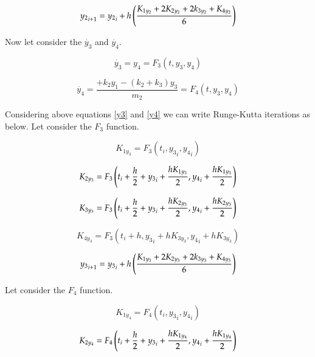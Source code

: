 \begin{equation}
    {y_2}_{i+1} = {y_2}_i +h \left( K_{1y_2}+ 2K_{2y_2} + 2k_{3y_2} +K_{4y_2}  \over 6 \right)
\end{equation}



Now let consider the $\dot{y_3}$ and $\dot{y_4}$. 

\begin{equation}
\label{y3}
    \dot{y_3} = y_4 = F_3(t,y_3,y_4)
\end{equation} 

\begin{equation}
\label{y4}
    \dot{y_4} = \frac{+k_2y_1-(k_2+k_3)y_3 }{m_2} = F_4(t,y_3,y_4)
\end{equation}

Considering above equations \eqref{y3} and \eqref{y4} we can write Runge-Kutta iterations as below. Let consider the $F_3$ function.

\begin{equation}
    {K_{1y_3}} = F_3(t_i,{y_3}_i,{y_4}_i)
\end{equation}

\begin{equation}
    {K_{2y_3}} = F_3\left( {{t_i}+\frac{h}{2} + {y_3}_i+{h K_{1y_3} \over 2},{y_4}_i + {h K_{1y_3} \over 2}} \right)
\end{equation}

\begin{equation}
    {K_{3y_3}} = F_3\left( {{t_i}+\frac{h}{2} + {y_3}_i+{h K_{2y_3} \over 2},{y_4}_i + {h K_{2y_3} \over 2}} \right)
\end{equation}

\begin{equation}
    {K_{4y_3}} = F_3\left( {{t_i}+h, {y_3}_i+{h K_{3y_3}},{y_4}_i + {h K_{3y_3}}} \right)
\end{equation}

\begin{equation}
    {y_3}_{i+1} = {y_3}_i +h \left( K_{1y_3}+ 2K_{2y_3} + 2k_{3y_3} +K_{4y_3}  \over 6 \right)
\end{equation}

Let consider the $F_4$ function. 

\begin{equation}
    {K_{1y_4}} = F_4(t_i,{y_3}_i,{y_4}_i)
\end{equation}

\begin{equation}
    {K_{2y_4}} = F_4\left( {{t_i}+\frac{h}{2} + {y_3}_i+{h K_{1y_4} \over 2},{y_4}_i + {h K_{1y_4} \over 2}} \right)
\end{equation}

